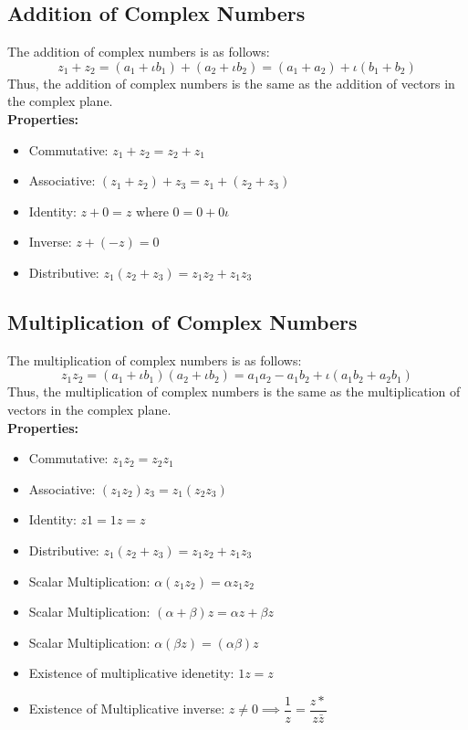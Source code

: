 \subsection{Addition of Complex Numbers}
The addition of complex numbers is as follows:
\[ z_1+z_2=(a_1+\iota b_1)+(a_2+\iota b_2)=(a_1+a_2)+\iota(b_1+b_2) \]
Thus, the addition of complex numbers is the same as the addition of vectors in the complex plane.\\
\textbf{Properties: }
\begin{itemize}
    \item Commutative: $z_1+z_2=z_2+z_1$
    \item Associative: $(z_1+z_2)+z_3=z_1+(z_2+z_3)$
    \item Identity: $z+0=z$ where $0=0+0\iota$
    \item Inverse: $z+(-z)=0$
    \item Distributive: $z_1(z_2+z_3)=z_1z_2+z_1z_3$
\end{itemize}

\subsection{Multiplication of Complex Numbers}
The multiplication of complex numbers is as follows:
\[ z_1z_2=(a_1+\iota b_1)(a_2+\iota b_2)=a_1a_2-a_1b_2+\iota(a_1b_2+a_2b_1) \]
Thus, the multiplication of complex numbers is the same as the multiplication of vectors in the complex plane.\\
\textbf{Properties: }
\begin{itemize}
    \item Commutative: $z_1z_2=z_2z_1$
    \item Associative: $(z_1z_2)z_3=z_1(z_2z_3)$
    \item Identity: $z1=1z=z$
    \item Distributive: $z_1(z_2+z_3)=z_1z_2+z_1z_3$
    \item Scalar Multiplication: $\alpha(z_1z_2)=\alpha z_1z_2$
    \item Scalar Multiplication: $(\alpha+\beta)z=\alpha z+\beta z$
    \item Scalar Multiplication: $\alpha(\beta z)=(\alpha \beta)z$
    \item Existence of multiplicative idenetity: $1z=z$
    \item Existence of Multiplicative inverse: $z\neq 0 \implies \dfrac{1}{z}=\dfrac{{z*}}{z\bar{z}}$
\end{itemize}

